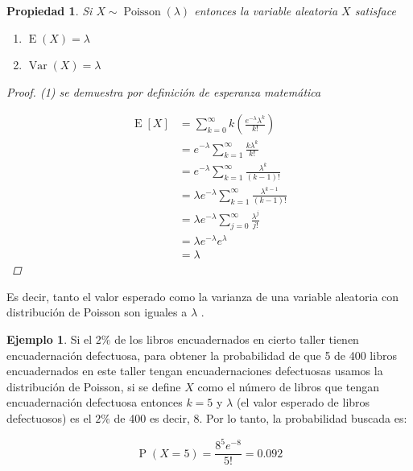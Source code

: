 \documentclass[]{book}
\theoremstyle{plain}
\newtheorem{property}[theorem]{Propiedad}
\theoremstyle{definition}
\newtheorem{example}[theorem]{Ejemplo}
\theoremstyle{definition} %
\begin{document}
\begin{property}
  
Si \(\displaystyle X\sim \operatorname {Poisson} (\lambda )\) entonces
la variable aleatoria \(X\) satisface  

\begin{enumerate}[(1)]
  \item $\displaystyle \operatorname {E} (X)=\lambda$
  \item $\displaystyle \operatorname {Var} (X)=\lambda $
\end{enumerate}
 
\begin{proof}
  (1) se demuestra por definición de esperanza matemática

\[\displaystyle {\begin{aligned}\operatorname {E} [X]&=\sum _{k=0}^{\infty }k\left({\frac {e^{-\lambda }\lambda ^{k}}{k!}}\right)\\&=e^{-\lambda }\sum _{k=1}^{\infty }{\frac {k\lambda ^{k}}{k!}}\\&=e^{-\lambda }\sum _{k=1}^{\infty }{\frac {\lambda ^{k}}{(k-1)!}}\\&=\lambda e^{-\lambda }\sum _{k=1}^{\infty }{\frac {\lambda ^{k-1}}{(k-1)!}}\\&=\lambda e^{-\lambda }\sum _{j=0}^{\infty }{\frac {\lambda ^{j}}{j!}}\\&=\lambda e^{-\lambda }e^{\lambda }\\&=\lambda \end{aligned}}\]
 
\end{proof}

\end{property}

Es decir, tanto el valor esperado como la varianza de una variable
aleatoria con distribución de Poisson son iguales a \(\lambda\) .


\begin{example}
  
Si el \(\displaystyle 2\%\) de los libros encuadernados en cierto taller
tienen encuadernación defectuosa, para obtener la probabilidad de que 5
de 400 libros encuadernados en este taller tengan encuadernaciones
defectuosas usamos la distribución de Poisson, si se define \(X\) como
el número de libros que tengan encuadernación defectuosa entonces
\(\displaystyle k=5\) y \(\lambda\) (el valor esperado de libros
defectuosos) es el \(\displaystyle 2\%\) de 400 es decir, 8. Por lo
tanto, la probabilidad buscada es:

\[\displaystyle \operatorname {P} (X=5)={\frac {8^{5}e^{-8}}{5!}}=0.092\]
\end{example}
\end{document}
